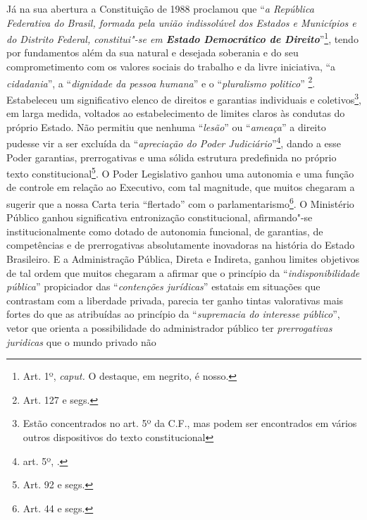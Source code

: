 Já na sua abertura a Constituição de 1988 proclamou que ``\emph{a
República Federativa do Brasil, formada pela união indissolúvel dos
Estados e Municípios e do Distrito Federal, constitui"-se em
\textbf{Estado Democrático de Direito}}''\footnote{Art. 1º,
  \emph{caput.} O destaque, em negrito, é nosso.}, tendo por fundamentos
além da sua natural e desejada soberania e do seu comprometimento com os
valores sociais do trabalho e da livre iniciativa, ``a
\emph{cidadania}'', a ``\emph{dignidade da pessoa humana}'' e o
``\emph{pluralismo politico}'' \footnote{Art. 127 e segs.}. Estabeleceu
um significativo elenco de direitos e garantias individuais e
coletivos\footnote{Estão concentrados no art. 5º da C.F., mas podem ser
  encontrados em vários outros dispositivos do texto constitucional}, em
larga medida, voltados ao estabelecimento de limites claros às condutas
do próprio Estado. Não permitiu que nenhuma ``\emph{lesão}'' ou
``\emph{ameaça}'' a direito pudesse vir a ser excluída da
``\emph{apreciação do Poder Judiciário}''\footnote{art. 5º, .},
dando a esse Poder garantias, prerrogativas e uma sólida estrutura
predefinida no próprio texto constitucional\footnote{Art. 92 e segs.}. O
Poder Legislativo ganhou uma autonomia e uma função de controle em
relação ao Executivo, com tal magnitude, que muitos chegaram a sugerir
que a nossa Carta teria ``flertado'' com o parlamentarismo\footnote{Art.
  44 e segs.}. O Ministério Público ganhou significativa entronização
constitucional, afirmando"-se institucionalmente como dotado de autonomia
funcional, de garantias, de competências e de prerrogativas
absolutamente inovadoras na história do Estado Brasileiro. E a
Administração Pública, Direta e Indireta, ganhou limites objetivos de
tal ordem que muitos chegaram a afirmar que o princípio da
``\emph{indisponibilidade pública}'' propiciador das ``\emph{contenções
jurídicas}'' estatais em situações que contrastam com a liberdade
privada, parecia ter ganho tintas valorativas mais fortes do que as
atribuídas ao princípio da ``\emph{supremacia do interesse público}'',
vetor que orienta a possibilidade do administrador público ter
\emph{prerrogativas juridicas} que o mundo privado não

